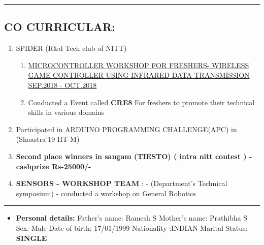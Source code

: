 \documentclass[10pts]{report}
\newcommand{\tab}[1]{\hspace{.2667\textwidth}\rlap{#1}}
\begin{document}
\par\noindent\rule{\textwidth}{0.1pt}
\begin{flushleft}
         \section*{CO CURRICULAR:}
              \begin{enumerate}
                               \item SPIDER (R\&d Tech club of  NITT)
                                         
                                          \begin{enumerate}
                                                    \item{\href{https://www.youtube.com/watch?v=C6ktntQEmCk}{ MICROCONTROLLER WORKSHOP FOR FRESHERS- WIRELESS GAME CONTROLLER USING INFRARED DATA TRANSMISSION SEP.2018 - OCT.2018}}
                                                    \item Conducted a Event called \textbf{CRE8}  For freshers  to promote their technical skills in various domains
                                           \end{enumerate} 
                                 \item Participated in ARDUINO PROGRAMMING CHALLENGE(APC) in (Shaastra'19 IIT-M)
                                 \item \textbf{Second place winners in sangam  (TIESTO) ( intra nitt contest ) -cashprize Rs-25000/-}
                                 \item \textbf{SENSORS - WORKSHOP TEAM } : - (Department's Technical symposium) - conducted a workshop on General Robotics                                
                      
              \end{enumerate}                                  
\end{flushleft}


\par\noindent\rule{\textwidth}{0.1pt}
\begin{flushleft}
          
            \begin{itemize}
                     \item {\textbf{Personal details:}}  Father's name: Ramesh S
                      \hfill{}   Mother's name: Prathibha S  
                    \hfill{}  Sex: Male
                       \tab{}Date of birth: 17/01/1999
                       \hfill{}Nationality :INDIAN
                      \hfill{}Marital Status: \textbf{SINGLE}

       \end{itemize}
                                               


     
\end{flushleft}
\end{document}

